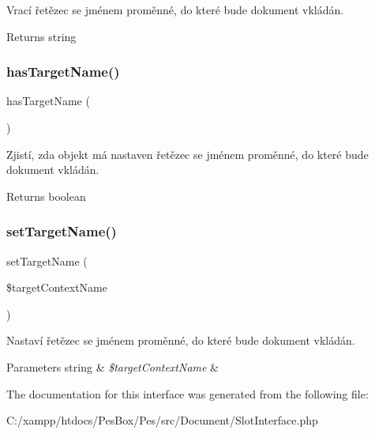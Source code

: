 Vrací řetězec se jménem proměnné, do které bude dokument vkládán. \begin{DoxyReturn}{Returns}
string 
\end{DoxyReturn}
\mbox{\label{interface_pes_1_1_document_1_1_slot_interface_a46620ed4fe2d28cd0f4627f9aa301dbc}} 
\subsubsection{\texorpdfstring{has\+Target\+Name()}{hasTargetName()}}
{\footnotesize\ttfamily has\+Target\+Name (\begin{DoxyParamCaption}{ }\end{DoxyParamCaption})}

Zjistí, zda objekt má nastaven řetězec se jménem proměnné, do které bude dokument vkládán. \begin{DoxyReturn}{Returns}
boolean 
\end{DoxyReturn}
\mbox{\label{interface_pes_1_1_document_1_1_slot_interface_ab2d062d8d5a2afbfa26c76004ea853fe}} 
\subsubsection{\texorpdfstring{set\+Target\+Name()}{setTargetName()}}
{\footnotesize\ttfamily set\+Target\+Name (\begin{DoxyParamCaption}\item[{}]{\$target\+Context\+Name }\end{DoxyParamCaption})}

Nastaví řetězec se jménem proměnné, do které bude dokument vkládán. 
\begin{DoxyParams}[1]{Parameters}
string & {\em \$target\+Context\+Name} & \\
\hline
\end{DoxyParams}


The documentation for this interface was generated from the following file\+:\begin{DoxyCompactItemize}
\item 
C\+:/xampp/htdocs/\+Pes\+Box/\+Pes/src/\+Document/Slot\+Interface.\+php\end{DoxyCompactItemize}
